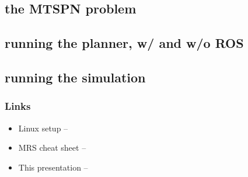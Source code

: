 \documentclass{beamer}
\begin{document}
\subsection{the MTSPN problem}
\subsection{running the planner, w/ and w/o ROS}

\subsection{running the simulation}
\begin{frame}
  \frametitle{}



\end{frame}


\begin{frame}
  \frametitle{Links}

  \begin{itemize}
    \item Linux setup --
    \item MRS cheat sheet --
    \item This presentation --
  \end{itemize}

\end{frame}

\end{document}

